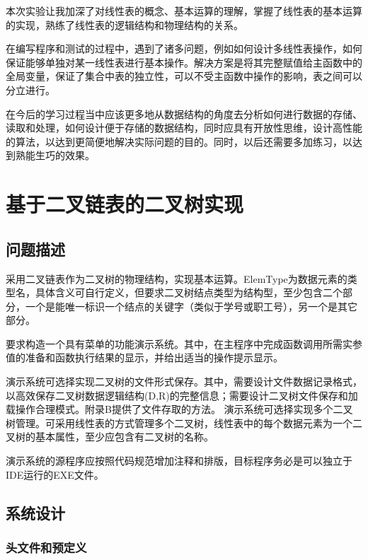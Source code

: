 \documentclass[supercite]{Experimental_Report}
\newcommand{\whiteding}[1]{\ding{\numexpr171+#1\relax}}
\theoremstyle{definition}
\begin{document}
本次实验让我加深了对线性表的概念、基本运算的理解，掌握了线性表的基本运算的实现，熟练了线性表的逻辑结构和物理结构的关系。

在编写程序和测试的过程中，遇到了诸多问题，例如如何设计多线性表操作，如何保证能够单独对某一线性表进行基本操作。解决方案是将其完整赋值给主函数中的
全局变量，保证了集合中表的独立性，可以不受主函数中操作的影响，表之间可以分立进行。

在今后的学习过程当中应该更多地从数据结构的角度去分析如何进行数据的存储、读取和处理，如何设计便于存储的数据结构，同时应具有开放性思维，设计高性能的算法，以达到更简便地解决实际问题的目的。同时，以后还需要多加练习，以达到熟能生巧的效果。

\newpage

\section{基于二叉链表的二叉树实现}

\subsection{问题描述}

采用二叉链表作为二叉树的物理结构，实现基本运算。ElemType为数据元素的类型名，具体含义可自行定义，但要求二叉树结点类型为结构型，至少包含二个部分，一个是能唯一标识一个结点的关键字（类似于学号或职工号），另一个是其它部分。

要求构造一个具有菜单的功能演示系统。其中，在主程序中完成函数调用所需实参值的准备和函数执行结果的显示，并给出适当的操作提示显示。

演示系统可选择实现二叉树的文件形式保存。其中，\whiteding{1}需要设计文件数据记录格式，以高效保存二叉树数据逻辑结构(D,{R})的完整信息；\whiteding{2}需要设计二叉树文件保存和加载操作合理模式。附录B提供了文件存取的方法。
演示系统可选择实现多个二叉树管理。可采用线性表的方式管理多个二叉树，线性表中的每个数据元素为一个二叉树的基本属性，至少应包含有二叉树的名称。

演示系统的源程序应按照代码规范增加注释和排版，目标程序务必是可以独立于IDE运行的EXE文件。

\subsection{系统设计}

\subsubsection{头文件和预定义}
\end{document}
